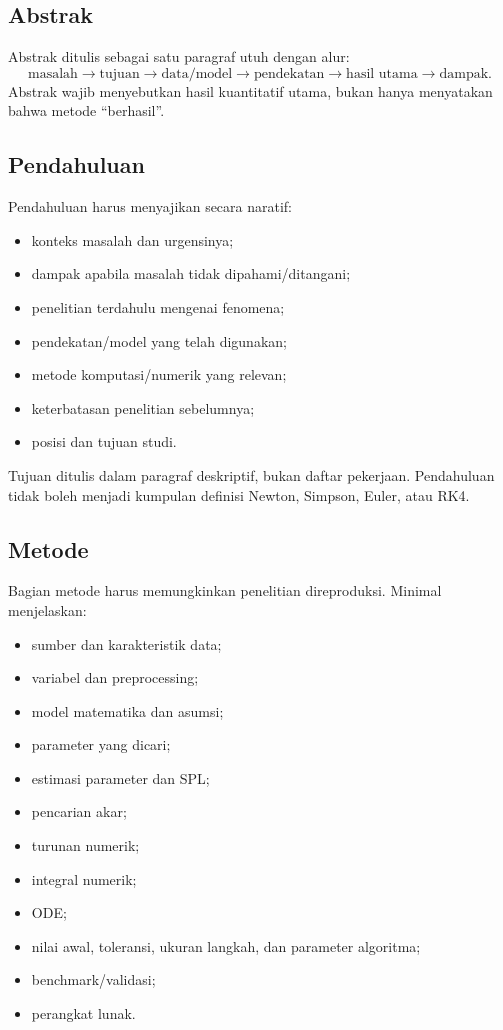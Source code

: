 \documentclass[11pt,a4paper]{article}
\begin{document}
\subsection{Abstrak}

Abstrak ditulis sebagai satu paragraf utuh dengan alur:
\[
\text{masalah} \rightarrow \text{tujuan} \rightarrow \text{data/model} \rightarrow \text{pendekatan} \rightarrow \text{hasil utama} \rightarrow \text{dampak}.
\]
Abstrak wajib menyebutkan hasil kuantitatif utama, bukan hanya menyatakan bahwa metode ``berhasil''.

\subsection{Pendahuluan}

Pendahuluan harus menyajikan secara naratif:
\begin{itemize}
    \item konteks masalah dan urgensinya;
    \item dampak apabila masalah tidak dipahami/ditangani;
    \item penelitian terdahulu mengenai fenomena;
    \item pendekatan/model yang telah digunakan;
    \item metode komputasi/numerik yang relevan;
    \item keterbatasan penelitian sebelumnya;
    \item posisi dan tujuan studi.
\end{itemize}

Tujuan ditulis dalam paragraf deskriptif, bukan daftar pekerjaan. Pendahuluan tidak boleh menjadi kumpulan definisi Newton, Simpson, Euler, atau RK4.

\subsection{Metode}

Bagian metode harus memungkinkan penelitian direproduksi. Minimal menjelaskan:
\begin{itemize}
    \item sumber dan karakteristik data;
    \item variabel dan preprocessing;
    \item model matematika dan asumsi;
    \item parameter yang dicari;
    \item estimasi parameter dan SPL;
    \item pencarian akar;
    \item turunan numerik;
    \item integral numerik;
    \item ODE;
    \item nilai awal, toleransi, ukuran langkah, dan parameter algoritma;
    \item benchmark/validasi;
    \item perangkat lunak.
\end{itemize}
\end{document}
